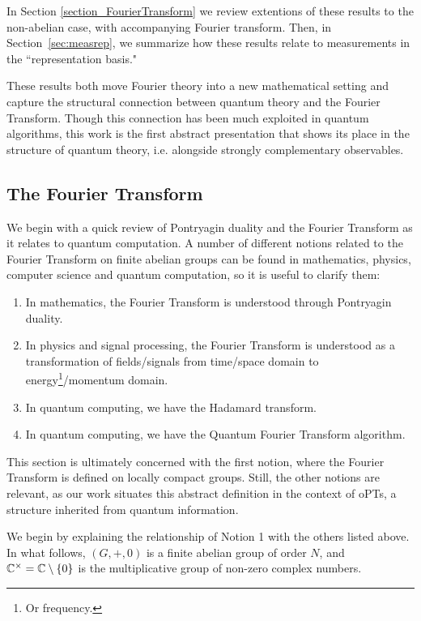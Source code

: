 In Section \ref{section_FourierTransform} we review extentions of these results to the non-abelian case, with accompanying Fourier transform. Then, in Section~\ref{sec:measrep}, we summarize how these results relate to measurements in the ``representation basis."

These results both move Fourier theory into a new mathematical setting and capture the structural connection between quantum theory and the Fourier Transform.  Though this connection has been much exploited in quantum algorithms, this work is the first abstract presentation that shows its place in the structure of quantum theory, i.e. alongside strongly complementary observables.
\subsection{The Fourier Transform}
\label{sec:FT}
We begin with a quick review of Pontryagin duality and the Fourier Transform as it relates to quantum computation. A number of different notions related to the Fourier Transform on finite abelian groups can be found in mathematics, physics, computer science and quantum computation, so it is useful to clarify them:

\begin{enumerate}
  \item[1.] In mathematics, the Fourier Transform is understood through Pontryagin duality.
  \item[2.] In physics and signal processing, the Fourier Transform is understood as a transformation of fields/signals from time/space domain to energy\footnote{Or frequency.}/momentum domain.
  \item[3.] In quantum computing, we have the Hadamard transform.
  \item[4.] In quantum computing, we have the Quantum Fourier Transform algorithm.
\end{enumerate}

This section is ultimately concerned with the first notion, where the Fourier Transform is defined on locally compact groups. Still, the other notions are relevant, as our work situates this abstract definition in the context of oPTs, a structure inherited from quantum information. 

We begin by explaining the relationship of Notion 1 with the others listed above. In what follows, $(G,+,0)$ is a finite abelian group of order $N$, and $\mathbb{C}^{\times}=\mathbb{C}\setminus\{0\}$ is the multiplicative group of non-zero complex numbers.


